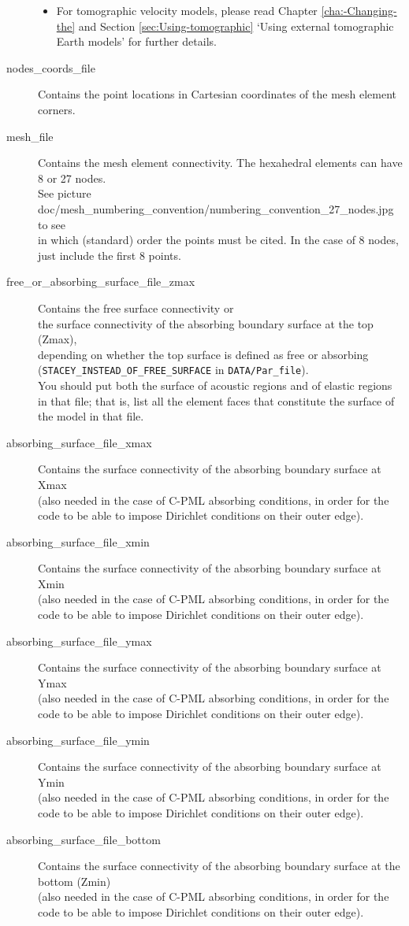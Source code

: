 \begin{description}
\begin{itemize}
\item For tomographic velocity models, please read Chapter \ref{cha:-Changing-the}
and Section \ref{sec:Using-tomographic} `Using external tomographic
Earth models' for further details.
\end{itemize}
\item [{nodes\_coords\_file}] Contains the point locations in Cartesian
coordinates of the mesh element corners.
\item [{mesh\_file}] Contains the mesh element connectivity. The hexahedral
elements can have 8 or 27 nodes.\\
 See picture doc/mesh\_numbering\_convention/numbering\_convention\_27\_nodes.jpg
to see\\
 in which (standard) order the points must be cited. In the case of
8 nodes, just include the first 8 points.
\item [{free\_or\_absorbing\_surface\_file\_zmax}] Contains the free surface
connectivity or \\
 the surface connectivity of the absorbing boundary surface at the
top (Zmax), \\
 depending on whether the top surface is defined as free or absorbing
(\texttt{STACEY\_INSTEAD\_OF\_FREE\_SURFACE} in \texttt{DATA/Par\_file}). \\
 You should put both the surface of acoustic regions and of elastic
regions in that file; that is, list all the element faces that constitute
the surface of the model in that file.
\item [{absorbing\_surface\_file\_xmax}] Contains the surface connectivity
of the absorbing boundary surface at Xmax \\
(also needed in the case of C-PML absorbing conditions, in order for
the code to be able to impose Dirichlet conditions on their outer
edge).
\item [{absorbing\_surface\_file\_xmin}] Contains the surface connectivity
of the absorbing boundary surface at Xmin \\
(also needed in the case of C-PML absorbing conditions, in order for
the code to be able to impose Dirichlet conditions on their outer
edge).
\item [{absorbing\_surface\_file\_ymax}] Contains the surface connectivity
of the absorbing boundary surface at Ymax \\
(also needed in the case of C-PML absorbing conditions, in order for
the code to be able to impose Dirichlet conditions on their outer
edge).
\item [{absorbing\_surface\_file\_ymin}] Contains the surface connectivity
of the absorbing boundary surface at Ymin \\
(also needed in the case of C-PML absorbing conditions, in order for
the code to be able to impose Dirichlet conditions on their outer
edge).
\item [{absorbing\_surface\_file\_bottom}] Contains the surface connectivity
of the absorbing boundary surface at the bottom (Zmin) \\
(also needed in the case of C-PML absorbing conditions, in order for
the code to be able to impose Dirichlet conditions on their outer
edge).
\end{description}
